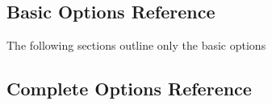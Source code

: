 \documentclass[11pt,letterpaper,oneside]{article}
\begin{document}
\subsection{Basic Options Reference}
The following sections outline only the basic options
\label{sec:options-basic-ref}



\clearpage

\subsection{Complete Options Reference}
\label{sec:options-ref}

\end{document}
